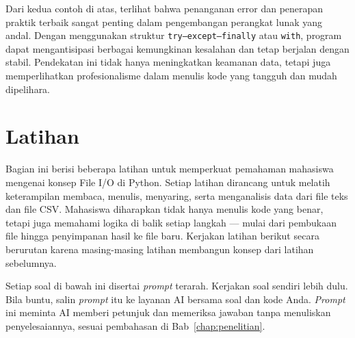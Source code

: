 Dari kedua contoh di atas, terlihat bahwa penanganan error dan penerapan praktik terbaik sangat penting dalam pengembangan perangkat lunak yang andal.  
Dengan menggunakan struktur \texttt{try--except--finally} atau \texttt{with}, program dapat mengantisipasi berbagai kemungkinan kesalahan dan tetap berjalan dengan stabil.  
Pendekatan ini tidak hanya meningkatkan keamanan data, tetapi juga memperlihatkan profesionalisme dalam menulis kode yang tangguh dan mudah dipelihara.


\section{Latihan}

Bagian ini berisi beberapa latihan untuk memperkuat pemahaman mahasiswa mengenai konsep File I/O di Python.  
Setiap latihan dirancang untuk melatih keterampilan membaca, menulis, menyaring, serta menganalisis data dari file teks dan file CSV.  
Mahasiswa diharapkan tidak hanya menulis kode yang benar, tetapi juga memahami logika di balik setiap langkah — mulai dari pembukaan file hingga penyimpanan hasil ke file baru.  
Kerjakan latihan berikut secara berurutan karena masing-masing latihan membangun konsep dari latihan sebelumnya.

Setiap soal di bawah ini disertai \textit{prompt} terarah. Kerjakan soal sendiri lebih dulu. Bila buntu, salin \textit{prompt} itu ke layanan AI bersama soal dan kode Anda. \textit{Prompt} ini meminta AI memberi petunjuk dan memeriksa jawaban tanpa menuliskan penyelesaiannya, sesuai pembahasan di Bab~\ref{chap:penelitian}.

